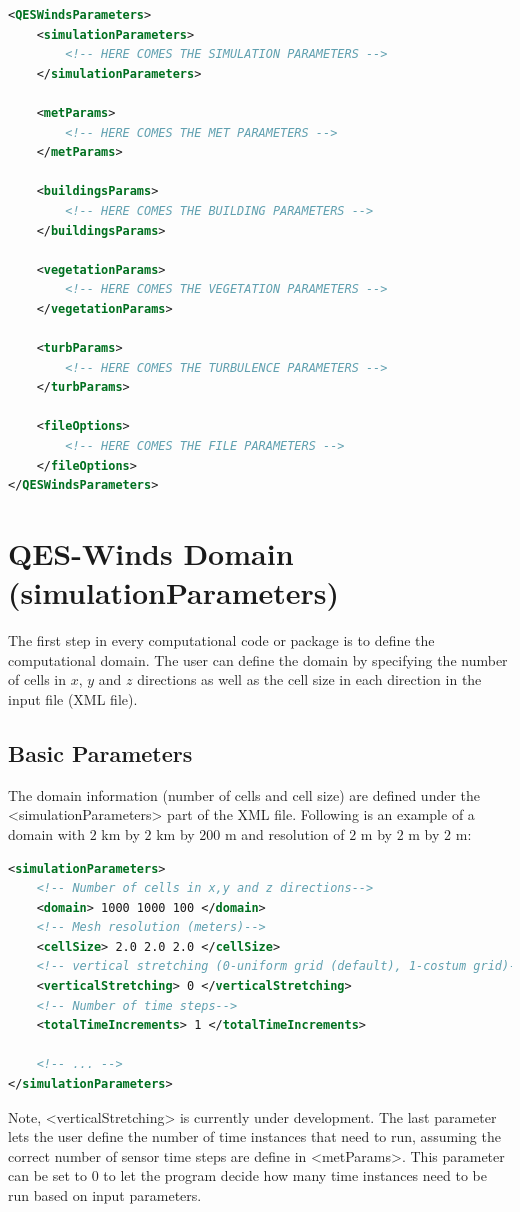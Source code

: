 \begin{lstlisting}[language=XML]
<QESWindsParameters>
	<simulationParameters>
		<!-- HERE COMES THE SIMULATION PARAMETERS -->
	</simulationParameters>

	<metParams>
		<!-- HERE COMES THE MET PARAMETERS -->
	</metParams>

	<buildingsParams>
		<!-- HERE COMES THE BUILDING PARAMETERS -->
	</buildingsParams>

	<vegetationParams>
		<!-- HERE COMES THE VEGETATION PARAMETERS -->
	</vegetationParams>

	<turbParams>
		<!-- HERE COMES THE TURBULENCE PARAMETERS -->
	</turbParams>

	<fileOptions>
		<!-- HERE COMES THE FILE PARAMETERS -->
	</fileOptions>
</QESWindsParameters>
\end{lstlisting}


\section{QES-Winds Domain (simulationParameters)}

The first step in every computational code or package is to define the computational domain. The user can define the domain by specifying the number of cells in $x$, $y$ and $z$ directions as well as the cell size in each direction in the input file (XML file).

\subsection{Basic Parameters}

The domain information (number of cells and cell size) are defined under the <simulationParameters> part of the XML file. Following is an example of a domain with $2$ km by $2$ km by $200$ m and resolution of $2$ m by $2$ m by $2$ m:

\begin{lstlisting}[language=XML]
<simulationParameters>
	<!-- Number of cells in x,y and z directions-->
	<domain> 1000 1000 100 </domain>
	<!-- Mesh resolution (meters)-->
	<cellSize> 2.0 2.0 2.0 </cellSize>
	<!-- vertical stretching (0-uniform grid (default), 1-costum grid)-->
	<verticalStretching> 0 </verticalStretching>   
	<!-- Number of time steps-->           
	<totalTimeIncrements> 1 </totalTimeIncrements> 			
	
	<!-- ... -->
</simulationParameters>
\end{lstlisting}
Note, <verticalStretching> is currently under development. The last parameter lets the user define the number of time instances that need to run, assuming the correct number of sensor time steps are define in <metParams>. This parameter can be set to 0 to let the program decide how many time instances need to be run based on input parameters.


